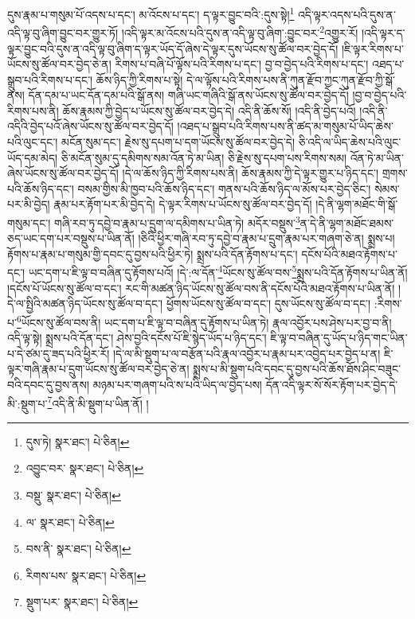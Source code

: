 དུས་རྣམ་པ་གསུམ་པོ་འདས་པ་དང་། མ་འོངས་པ་དང་། ད་ལྟར་བྱུང་བའི་:དུས་སྟེ།\footnote{དུས་ཏེ།  སྣར་ཐང་།  པེ་ཅིན། } འདི་ལྟར་འདས་པའི་དུས་ན་འདི་ལྟ་བུ་ཞིག་བྱུང་བར་གྱུར་ཏོ། །འདི་ལྟར་མ་འོངས་པའི་དུས་ན་འདི་ལྟ་བུ་ཞིག་:བྱུང་བར་\footnote{འབྱུང་བར་  སྣར་ཐང་།  པེ་ཅིན། }འགྱུར་རོ། །འདི་ལྟར་ད་ལྟར་བྱུང་བའི་དུས་ན་འདི་ལྟ་བུ་ཞིག་ད་ལྟར་ཡོད་དོ་ཞེས་དེ་ལྟར་དུས་ཡོངས་སུ་ཚོལ་བར་བྱེད་དོ། །ཇི་ལྟར་རིགས་པ་ཡོངས་སུ་ཚོལ་བར་བྱེད་ཅེ་ན། རིགས་པ་བཞི་པོ་ལྟོས་པའི་རིགས་པ་དང་། བྱ་བ་བྱེད་པའི་རིགས་པ་དང་། འཐད་པ་སྒྲུབ་པའི་རིགས་པ་དང་། ཆོས་ཉིད་ཀྱི་རིགས་པ་སྟེ། དེ་ལ་ལྟོས་པའི་རིགས་པས་ནི་ཀུན་རྫོབ་ཀྱང་ཀུན་རྫོབ་ཀྱི་སྒོ་ནས། དོན་དམ་པ་ཡང་དོན་དམ་པའི་སྒོ་ནས། གཞི་ཡང་གཞིའི་སྒོ་ནས་ཡོངས་སུ་ཚོལ་བར་བྱེད་དོ། །བྱ་བ་བྱེད་པའི་རིགས་པས་ནི། ཆོས་རྣམས་ཀྱི་བྱེད་པ་ཡོངས་སུ་ཚོལ་བར་བྱེད་དེ། འདི་ནི་ཆོས་སོ། །འདི་ནི་བྱེད་པའོ། །འདི་ནི་འདིའི་བྱེད་པའོ་ཞེས་ཡོངས་སུ་ཚོལ་བར་བྱེད་དོ། །འཐད་པ་སྒྲུབ་པའི་རིགས་པས་ནི་ཚད་མ་གསུམ་པོ་ཡིད་ཆེས་པའི་ལུང་དང་། མངོན་སུམ་དང་། རྗེས་སུ་དཔག་པ་དག་ཡོངས་སུ་ཚོལ་བར་བྱེད་དེ། ཅི་འདི་ལ་ཡིད་ཆེས་པའི་ལུང་ཡོད་དམ་མེད། ཅི་མངོན་སུམ་དུ་དམིགས་སམ་འོན་ཏེ་མ་ཡིན། ཅི་རྗེས་སུ་དཔག་པས་རིགས་སམ། འོན་ཏེ་མ་ཡིན་ཞེས་ཡོངས་སུ་ཚོལ་བར་བྱེད་དོ། །དེ་ལ་ཆོས་ཉིད་ཀྱི་རིགས་པས་ནི། ཆོས་རྣམས་ཀྱི་དེ་ལྟར་གྱུར་པ་ཉིད་དང་། གྲགས་པའི་ཆོས་ཉིད་དང་། བསམ་གྱིས་མི་ཁྱབ་པའི་ཆོས་ཉིད་དང་། གནས་པའི་ཆོས་ཉིད་ལ་མོས་པར་བྱེད་ཅིང་། སེམས་པར་མི་བྱེད། རྣམ་པར་རྟོག་པར་མི་བྱེད་དེ། དེ་ལྟར་རིགས་པ་ཡོངས་སུ་ཚོལ་བར་བྱེད་དོ། །དེ་ནི་ལྷག་མཐོང་གི་སྒོ་གསུམ་དང་། གཞི་རབ་ཏུ་དབྱེ་བ་རྣམ་པ་དྲུག་ལ་དམིགས་པ་ཡིན་ཏེ། མདོར་བསྡུས་\footnote{བསྡུ་  སྣར་ཐང་།  པེ་ཅིན། }ན་དེ་ནི་ལྷག་མཐོང་ཐམས་ཅད་ཡང་དག་པར་བསྡུས་པ་ཡིན་ནོ། །ཅིའི་ཕྱིར་གཞི་རབ་ཏུ་དབྱེ་བ་རྣམ་པ་དྲུག་རྣམ་པར་གཞག་ཅེ་ན། སྨྲས་པ། རྟོགས་པ་རྣམ་པ་གསུམ་གྱི་དབང་དུ་བྱས་པའི་ཕྱིར་ཏེ། སྨྲས་པའི་དོན་རྟོགས་པ་དང་། དངོས་པོའི་མཐའ་རྟོགས་པ་དང་། ཡང་དག་པ་ཇི་ལྟ་བ་བཞིན་དུ་རྟོགས་པའོ། །དེ་:ལ་དོན་\footnote{ལ་  སྣར་ཐང་།  པེ་ཅིན། }ཡོངས་སུ་ཚོལ་བས་\footnote{བས་ནི་  སྣར་ཐང་།  པེ་ཅིན། }སྨྲས་པའི་དོན་རྟོགས་པ་ཡིན་ནོ། །དངོས་པོ་ཡོངས་སུ་ཚོལ་བ་དང་། རང་གི་མཚན་ཉིད་ཡོངས་སུ་ཚོལ་བས་ནི་དངོས་པོའི་མཐའ་རྟོགས་པ་ཡིན་ནོ། །དེ་ལ་སྤྱིའི་མཚན་ཉིད་ཡོངས་སུ་ཚོལ་བ་དང་། ཕྱོགས་ཡོངས་སུ་ཚོལ་བ་དང་། དུས་ཡོངས་སུ་ཚོལ་བ་དང་། :རིགས་པ་\footnote{རིགས་པས་  སྣར་ཐང་།  པེ་ཅིན། }ཡོངས་སུ་ཚོལ་བས་ནི། ཡང་དག་པ་ཇི་ལྟ་བ་བཞིན་དུ་རྟོགས་པ་ཡིན་ཏེ། རྣལ་འབྱོར་པས་ཤེས་པར་བྱ་བ་ནི། འདི་ལྟ་སྟེ། སྨྲས་པའི་དོན་དང་། ཤེས་བྱའི་དངོས་པོ་ཇི་སྙེད་ཡོད་པ་ཉིད་དང་། ཇི་ལྟ་བ་བཞིན་དུ་ཡོད་པ་ཉིད་གང་ཡིན་པ་དེ་ཙམ་དུ་ཟད་པའི་ཕྱིར་རོ། །དེ་ལ་མི་སྡུག་པ་ལ་བརྩོན་པའི་རྣལ་འབྱོར་པ་རྣམ་པར་འབྱེད་པར་བྱེད་པ་ན། ཇི་ལྟར་གཞི་རྣམ་པ་དྲུག་ཡོངས་སུ་ཚོལ་བར་བྱེད་ཅེ་ན། སྨྲས་པ་མི་སྡུག་པའི་དབང་དུ་བྱས་པའི་ཆོས་ཐོས་ཤིང་བཟུང་བའི་དབང་དུ་བྱས་ནས། མཉམ་པར་གཞག་པའི་ས་པའི་ཡིད་ལ་བྱེད་པས། དོན་འདི་ལྟར་སོ་སོར་རྟོག་པར་བྱེད་དེ་མི་:སྡུག་པ་\footnote{སྡུག་པར་  སྣར་ཐང་།  པེ་ཅིན། }འདི་ནི་མི་སྡུག་པ་ཡིན་ནོ། །
